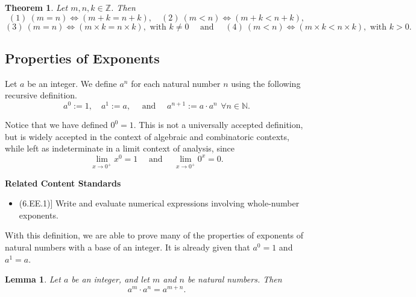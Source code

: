\documentclass[
]{book}
\providecommand{\tightlist}{%
  \setlength{\itemsep}{0pt}\setlength{\parskip}{0pt}}
\newenvironment{standards}{}{}
\newtheorem{theorem}{Theorem}[chapter]
\newtheorem{lemma}{Lemma}[chapter]
\theoremstyle{definition}
\theoremstyle{definition}
\theoremstyle{definition}
\theoremstyle{definition}
\theoremstyle{remark}
\begin{document}
\begin{theorem}
Let \(m,n,k\in \mathbb{Z}\). Then \[(1) \: (m=n) \Leftrightarrow (m+k=n+k),  \quad (2) \: (m<n) \Leftrightarrow (m+k<n+k),\]
\[ (3) \: (m=n) \Leftrightarrow (m\times k=n\times k), \mbox{ with } k\neq 0 \quad \mbox{ and } \quad (4) \: (m<n) \Leftrightarrow (m\times k<n\times k), \mbox{ with } k> 0 .\]
\end{theorem}

\hypertarget{properties-of-exponents}{%
\subsection{Properties of Exponents}\label{properties-of-exponents}}

Let \(a\) be an integer. We define \(a^n\) for each natural number \(n\) using the following recursive definition.
\[a^0:=1, \quad a^1 := a, \quad \mbox{ and } \quad a^{n+1}:=a \cdot a^n\, \: \forall n\in \mathbb{N}.\]

Notice that we have defined \(0^0=1\). This is not a universally accepted definition, but is widely accepted in the context of algebraic and combinatoric contexts, while left as indeterminate in a limit context of analysis, since
\[\lim_{x\rightarrow 0^+} x^0 = 1 \quad \mbox{ and } \quad \lim_{x\rightarrow 0^+} 0^x = 0.\]

\begin{standards}

\begin{center}
\textbf{Related Content Standards}

\end{center}

\begin{itemize}
\tightlist
\item
  (6.EE.1){]} Write and evaluate numerical expressions involving whole-number exponents.
\end{itemize}

\end{standards}

With this definition, we are able to prove many of the properties of exponents of natural numbers with a base of an integer. It is already given that \(a^0=1\) and \(a^1=a\).

\begin{lemma}
\protect\hypertarget{lem:exponent-addition}{}\label{lem:exponent-addition}Let \(a\) be an integer, and let \(m\) and \(n\) be natural numbers. Then
\[a^m\cdot a^n=a^{m+n}.\]
\end{lemma}
\end{document}

